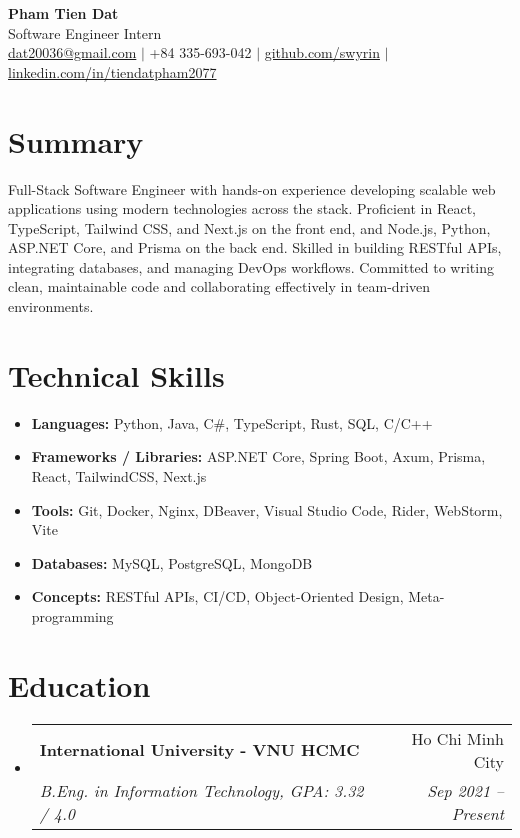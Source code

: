 \documentclass[letterpaper,11pt]{article}
\makeatletter
\newcommand{\resumeSubheading}[4]{
  \item
    \begin{tabular*}{\textwidth}{l@{\extracolsep{\fill}}r}
      \textbf{#1} & #2 \\
      \textit{#3} & \textit{#4} \\
    \end{tabular*}
}
\newcommand{\resumeSectionStart}{\begin{itemize}[leftmargin=0.15in, label={}]}
\newcommand{\resumeSectionEnd}{\end{itemize}}
\makeatother
\begin{document}
\begin{center}
  \textbf{\Huge Pham Tien Dat} \\ \vspace{1pt}
  Software Engineer Intern \\ \vspace{1pt}
  \href{mailto:dat20036@gmail.com}{dat20036@gmail.com} $|$
  +84 335-693-042 $|$
  \href{https://github.com/swyrin}{github.com/swyrin} $|$
  \href{https://linkedin.com/in/tiendatpham2077}{linkedin.com/in/tiendatpham2077}
\end{center}

\section*{Summary}
Full-Stack Software Engineer with hands-on experience developing scalable web applications using modern technologies across the stack. Proficient in React, TypeScript, Tailwind CSS, and Next.js on the front end, and Node.js, Python, ASP.NET Core, and Prisma on the back end. Skilled in building RESTful APIs, integrating databases, and managing DevOps workflows. Committed to writing clean, maintainable code and collaborating effectively in team-driven environments.

\section*{Technical Skills}
\resumeSectionStart
  \item \textbf{Languages:} Python, Java, C\#, TypeScript, Rust, SQL, C/C++
  \item \textbf{Frameworks / Libraries:} ASP.NET Core, Spring Boot, Axum, Prisma, React, TailwindCSS, Next.js
  \item \textbf{Tools:} Git, Docker, Nginx, DBeaver, Visual Studio Code, Rider, WebStorm, Vite
  \item \textbf{Databases:} MySQL, PostgreSQL, MongoDB
  \item \textbf{Concepts:} RESTful APIs, CI/CD, Object-Oriented Design, Meta-programming
\resumeSectionEnd

\section*{Education}
\resumeSectionStart
  \resumeSubheading
    {International University - VNU HCMC}{Ho Chi Minh City}
    {B.Eng. in Information Technology, GPA: 3.32 / 4.0}{Sep 2021 -- Present}
\resumeSectionEnd
\end{document}
